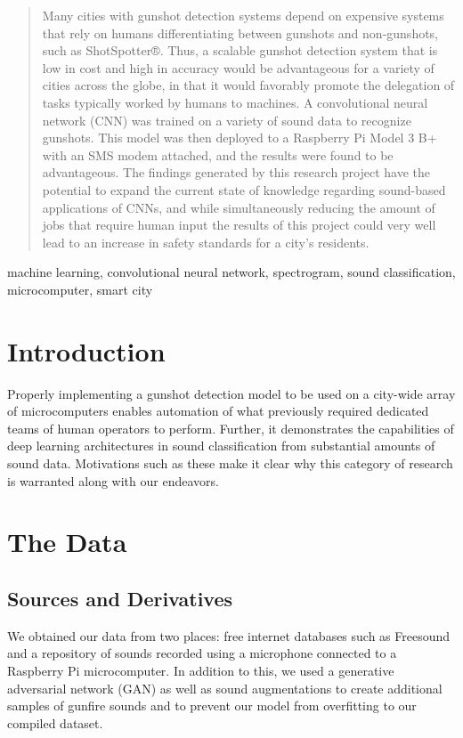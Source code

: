 \documentclass[conference]{IEEEtran}
\begin{document}
\begin{abstract}
Many cities with gunshot detection systems depend on expensive systems that rely on humans differentiating between gunshots and non-gunshots, such as ShotSpotter®. Thus, a scalable gunshot detection system that is low in cost and high in accuracy would be advantageous for a variety of cities across the globe, in that it would favorably promote the delegation of tasks typically worked by humans to machines. A convolutional neural network (CNN) was trained on a variety of sound data to recognize gunshots. This model was then deployed to a Raspberry Pi Model 3 B+ with an SMS modem attached, and the results were found to be advantageous. The findings generated by this research project have the potential to expand the current state of knowledge regarding sound-based applications of CNNs, and while simultaneously reducing the amount of jobs that require human input the results of this project could very well lead to an increase in safety standards for a city’s residents.
\end{abstract}

\begin{IEEEkeywords} machine learning, convolutional neural network, spectrogram, sound classification, microcomputer, smart city
\end{IEEEkeywords}

\section{Introduction}
Properly implementing a gunshot detection model to be used on a city-wide array of microcomputers enables automation of what previously required dedicated teams of human operators to perform. Further, it demonstrates the capabilities of deep learning architectures in sound classification from substantial amounts of sound data. Motivations such as these make it clear why this category of research is warranted along with our endeavors.

\section{The Data}

\subsection{Sources and Derivatives}

We obtained our data from two places: free internet  databases such as Freesound and a repository of sounds recorded using a microphone connected to a Raspberry Pi microcomputer. In addition to this, we used a generative adversarial network (GAN) as well as sound augmentations to create additional samples of gunfire sounds and to prevent our model from overfitting to our compiled dataset.
\end{document}
